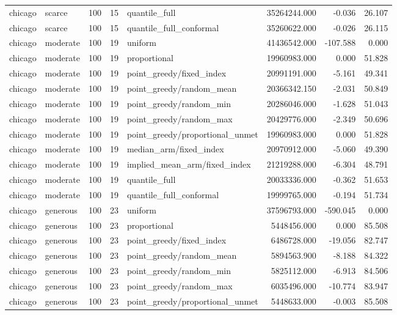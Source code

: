 \begin{tabular}{llrrlrrr}
chicago & scarce & 100 & 15 & quantile\_full & 35264244.000 & -0.036 & 26.107 \\
chicago & scarce & 100 & 15 & quantile\_full\_conformal & 35260622.000 & -0.026 & 26.115 \\
chicago & moderate & 100 & 19 & uniform & 41436542.000 & -107.588 & 0.000 \\
chicago & moderate & 100 & 19 & proportional & 19960983.000 & 0.000 & 51.828 \\
chicago & moderate & 100 & 19 & point\_greedy/fixed\_index & 20991191.000 & -5.161 & 49.341 \\
chicago & moderate & 100 & 19 & point\_greedy/random\_mean & 20366342.150 & -2.031 & 50.849 \\
chicago & moderate & 100 & 19 & point\_greedy/random\_min & 20286046.000 & -1.628 & 51.043 \\
chicago & moderate & 100 & 19 & point\_greedy/random\_max & 20429776.000 & -2.349 & 50.696 \\
chicago & moderate & 100 & 19 & point\_greedy/proportional\_unmet & 19960983.000 & 0.000 & 51.828 \\
chicago & moderate & 100 & 19 & median\_arm/fixed\_index & 20970912.000 & -5.060 & 49.390 \\
chicago & moderate & 100 & 19 & implied\_mean\_arm/fixed\_index & 21219288.000 & -6.304 & 48.791 \\
chicago & moderate & 100 & 19 & quantile\_full & 20033336.000 & -0.362 & 51.653 \\
chicago & moderate & 100 & 19 & quantile\_full\_conformal & 19999765.000 & -0.194 & 51.734 \\
chicago & generous & 100 & 23 & uniform & 37596793.000 & -590.045 & 0.000 \\
chicago & generous & 100 & 23 & proportional & 5448456.000 & 0.000 & 85.508 \\
chicago & generous & 100 & 23 & point\_greedy/fixed\_index & 6486728.000 & -19.056 & 82.747 \\
chicago & generous & 100 & 23 & point\_greedy/random\_mean & 5894563.900 & -8.188 & 84.322 \\
chicago & generous & 100 & 23 & point\_greedy/random\_min & 5825112.000 & -6.913 & 84.506 \\
chicago & generous & 100 & 23 & point\_greedy/random\_max & 6035496.000 & -10.774 & 83.947 \\
chicago & generous & 100 & 23 & point\_greedy/proportional\_unmet & 5448633.000 & -0.003 & 85.508 \\

\end{tabular}
